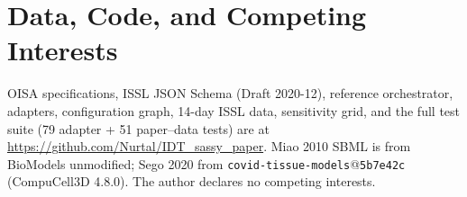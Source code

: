 \documentclass[conference,letterpaper,10pt]{IEEEtran}
\begin{document}
\section*{Data, Code, and Competing Interests}
OISA specifications, ISSL JSON Schema (Draft 2020-12), reference
orchestrator, adapters, configuration graph, 14-day ISSL data, sensitivity
grid, and the full test suite (79 adapter + 51 paper--data tests) are at
\url{https://github.com/Nurtal/IDT_sassy_paper}. Miao 2010 SBML is from
BioModels unmodified; Sego 2020 from
\texttt{covid-tissue-models}@\texttt{5b7e42c} (CompuCell3D 4.8.0). The
author declares no competing interests.

{\scriptsize


}
\end{document}

